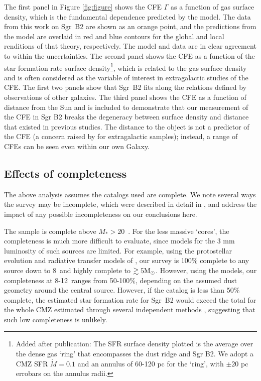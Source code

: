\documentclass[twocolumn]{aastex62}
\begin{document}
The first panel in Figure \ref{fig:figure} shows the CFE $\Gamma$ as a function
of gas surface density, which is the fundamental dependence predicted by the
model. The data from this work on Sgr~B2 are shown as an orange point, and the
predictions from the \citet{Kruijssen2012a} model are overlaid in red and blue
contours for the global and local renditions of that theory, respectively. The
model and data are in clear agreement to within the uncertainties. The second
panel shows the CFE as a function of the star formation rate surface
density\footnote{Added after publication: The SFR surface density plotted is
the average over the dense gas `ring' that encompasses the dust ridge and Sgr
B2.  We adopt a CMZ SFR $\dot{M}=0.1$ \msun \peryr and an annulus of 60-120 pc
for the `ring', with $\pm20$ pc errobars on the annulus radii.},
which is related to the gas surface density
\citep[e.g.,][]{Kennicutt1998a,Bigiel2008a,Leroy2013a} and is often considered
as the variable of interest in extragalactic studies of the CFE. The first two
panels show that Sgr~B2 fits along the relations defined by observations of
other galaxies. The third panel shows the CFE as a function of distance from
the Sun and is included to demonstrate that our measurement of the CFE in Sgr
B2 breaks the degeneracy between surface density and distance that existed in
previous studies. The distance to the object is not a predictor of the CFE (a
concern raised by \citealt{Adamo2011a} for extragalactic samples); instead, a
range of CFEs can be seen even within our own Galaxy.

\subsection{Effects of completeness}
The above analysis assumes the catalogs used are complete.  We note several
ways the survey may be incomplete, which were described in detail in
\citet{Ginsburg2018a}, and address the impact of any possible incompleteness
on our conclusions here.

The sample is complete above $M_*>20$~\msun. For the less massive `cores', the
completeness is much more difficult to evaluate, since models for the 3 mm
luminosity of such sources are limited.  For example, using the protostellar
evolution and radiative transfer models of \citet{Zhang2018b}, our survey is
100\% complete to any source down to 8~\msun and highly complete to
$\gtrsim5\mathrm{M}_{\odot}$.  However, using the \citet{Robitaille2017a} models, our
completeness at 8-12~\msun ranges from 50-100\%, depending on the assumed
dust geometry around the central source.  However, if the catalog is less than 50\%
complete, the estimated star formation rate for Sgr~B2 would exceed
the total for the whole CMZ estimated through several independent methods
\citep{Barnes2017b}, suggesting that such low completeness is unlikely.
\end{document}
